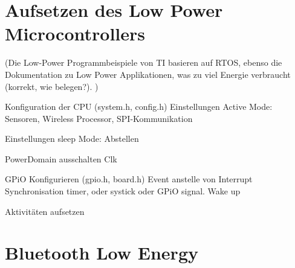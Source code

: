 \section{Aufsetzen des Low Power Microcontrollers}
(Die Low-Power Programmbeispiele von TI basieren auf RTOS, ebenso die Dokumentation zu Low Power Applikationen, was zu viel Energie verbraucht (korrekt, wie belegen?). )

Konfiguration der CPU (system.h, config.h)
Einstellungen Active Mode: Sensoren, Wireless Processor, SPI-Kommunikation

Einstellungen sleep Mode: Abstellen

PowerDomain ausschalten
Clk

GPiO Konfigurieren (gpio.h, board.h)
Event anstelle von Interrupt
Synchronisation
timer, oder systick oder GPiO signal. Wake up

Aktivitäten aufsetzen







\section{Bluetooth Low Energy}





